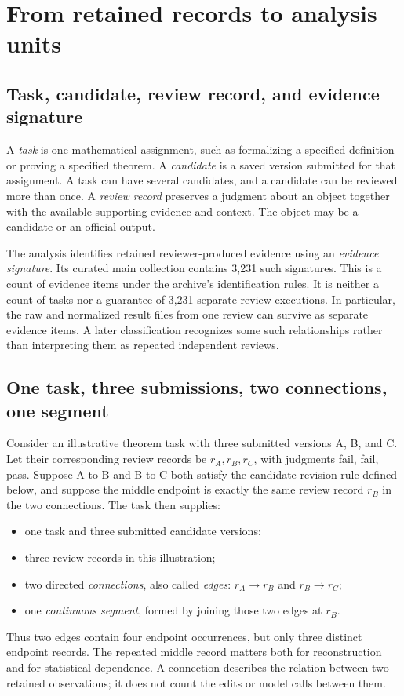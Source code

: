 \section{From retained records to analysis units}
\label{sec:materials}
\subsection{Task, candidate, review record, and evidence signature}
\label{subsec:record-units}
A \emph{task} is one mathematical assignment, such as formalizing a specified definition or proving a specified theorem. A \emph{candidate} is a saved version submitted for that assignment. A task can have several candidates, and a candidate can be reviewed more than once. A \emph{review record} preserves a judgment about an object together with the available supporting evidence and context. The object may be a candidate or an official output.

The analysis identifies retained reviewer-produced evidence using an \emph{evidence signature}. Its curated main collection contains 3,231 such signatures. This is a count of evidence items under the archive's identification rules. It is neither a count of tasks nor a guarantee of 3,231 separate review executions. In particular, the raw and normalized result files from one review can survive as separate evidence items. A later classification recognizes some such relationships rather than interpreting them as repeated independent reviews.

\subsection{One task, three submissions, two connections, one segment}
\label{subsec:running-example}
Consider an illustrative theorem task with three submitted versions A, B, and C. Let their corresponding review records be $r_A,r_B,r_C$, with judgments fail, fail, pass. Suppose A-to-B and B-to-C both satisfy the candidate-revision rule defined below, and suppose the middle endpoint is exactly the same review record $r_B$ in the two connections. The task then supplies:
\begin{itemize}[leftmargin=*,nosep]
\item one task and three submitted candidate versions;
\item three review records in this illustration;
\item two directed \emph{connections}, also called \emph{edges}: $r_A\to r_B$ and $r_B\to r_C$;
\item one \emph{continuous segment}, formed by joining those two edges at $r_B$.
\end{itemize}
Thus two edges contain four endpoint occurrences, but only three distinct endpoint records. The repeated middle record matters both for reconstruction and for statistical dependence. A connection describes the relation between two retained observations; it does not count the edits or model calls between them.

